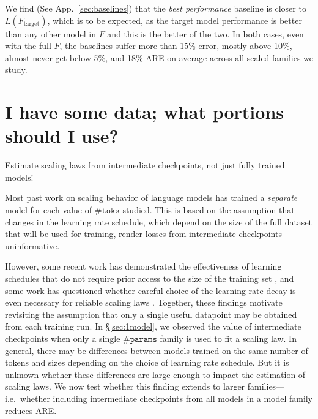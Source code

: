 \documentclass{article}
\theoremstyle{plain}
\theoremstyle{definition}
\theoremstyle{remark}
\newcommand{\mathmsize}{\#\texttt{params}}
\newcommand{\mathtokens}{\#\texttt{toks}}
\newcommand{\mathperf}{L}
\newcommand{\msize}{$\mathmsize{}$}
\newcommand{\tokens}{$\mathtokens{}$}
\newcommand{\xtarget}{F_\mathrm{target}}
\newcommand{\summarybox}[1]{
  \begin{tcolorbox}[
    enhanced,
    colback=olive!8,
    colframe=olive!50,
    boxrule=0.5pt,
    left=8pt,
    right=8pt,
    top=6pt,
    bottom=6pt,
    arc=1.5mm,
    boxsep=0pt,
    fontupper=\normalfont\small\itshape,
    frame hidden,
    before skip=0pt,  %
    after skip=8pt,   %
  ]
    #1
  \end{tcolorbox}
}
\begin{document}
We find (See App.~\ref{sec:baselines}) that  the \emph{best performance} baseline is closer to $\mathperf{}(\xtarget)$, which is to be expected, as the target model performance is better than any other model in $F$ and this is the better of the two. In both cases, even with the full $F$, the baselines suffer more than 15\% error, mostly above 10\%, almost never get below 5\%, and 18\% ARE on average across all scaled families we study. %


\section{I have some data; what portions should I use?}\label{sec:data_subset}
\summarybox{Estimate scaling laws from intermediate checkpoints, not just fully trained models!}


Most past work on scaling behavior of language models \citep[e.g.,][]{overtrain,datablations} has trained a \emph{separate} model for each value of \tokens{} studied. This is based on the assumption that changes in the learning rate schedule, which depend on the size of the full dataset that will be used for training, render losses from intermediate checkpoints uninformative.

However, some recent work has demonstrated the effectiveness of learning schedules that do not require prior access to the size of the training set \citep{hu2024minicpm}, and some work has questioned whether careful choice of the learning rate decay is even necessary for reliable scaling laws \citep{porian2024resolving}.
Together, these findings motivate revisiting the assumption that only a single useful datapoint may be obtained from each training run.
In \S\ref{sec:1model}, we observed the value of intermediate checkpoints when only a single \msize{} family is used to fit a scaling law. In general, there may be differences between models trained on the same number of tokens and sizes depending on the choice of learning rate schedule. But it is unknown whether these differences are large enough to impact the estimation of scaling laws.
We now test whether this finding extends to larger families---i.e.\ whether including intermediate checkpoints from all models in a model family reduces ARE.
\end{document}
